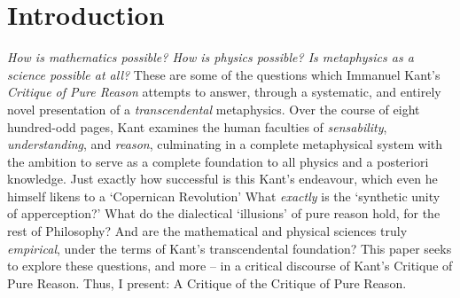 \section*{Introduction}
\emph{How is mathematics possible? How is physics possible? Is metaphysics as a science possible at all?} These are some of the questions which Immanuel Kant's \emph{Critique of Pure Reason} attempts to answer, through a systematic, and entirely novel presentation of a \emph{transcendental} metaphysics. Over the course of eight hundred-odd pages, Kant examines the human faculties of \emph{sensability}, \emph{understanding}, and \emph{reason}, culminating in a complete metaphysical system with the ambition to serve as a complete foundation to all physics and a posteriori knowledge. Just exactly how successful is this Kant's endeavour, which even he himself likens to a `Copernican Revolution' What \emph{exactly} is the `synthetic unity of apperception?' What do the dialectical `illusions' of pure reason hold, for the rest of Philosophy? And are the mathematical and physical sciences truly \emph{empirical}, under the terms of Kant's transcendental foundation? This paper seeks to explore these questions, and more -- in a critical discourse of Kant's Critique of Pure Reason. Thus, I present: A Critique of the Critique of Pure Reason.
